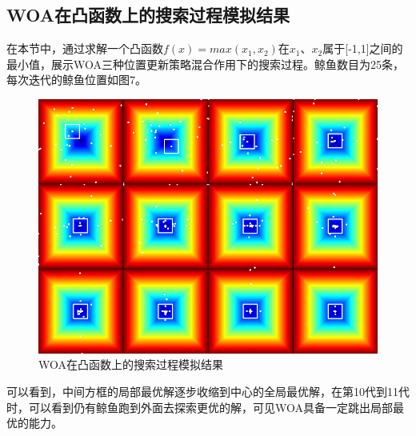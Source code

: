 \documentclass[12pt,a4paper]{article}
\begin{document}
\subsection{WOA在凸函数上的搜索过程模拟结果}
在本节中，通过求解一个凸函数$f(x)=max(x_1,x_2)$在$x_1$、$x_2$属于[-1,1]之间的最小值，展示WOA三种位置更新策略混合作用下的搜索过程。鲸鱼数目为25条，每次迭代的鲸鱼位置如图7。
\begin{figure}[H]
\centering
\includegraphics[width=1.0\textwidth]{figure/c.png}
\renewcommand\figurename{图}\caption{WOA在凸函数上的搜索过程模拟结果}
\end{figure}

可以看到，中间方框的局部最优解逐步收缩到中心的全局最优解，在第10代到11代时，可以看到仍有鲸鱼跑到外面去探索更优的解，可见WOA具备一定跳出局部最优的能力。
\end{document}
